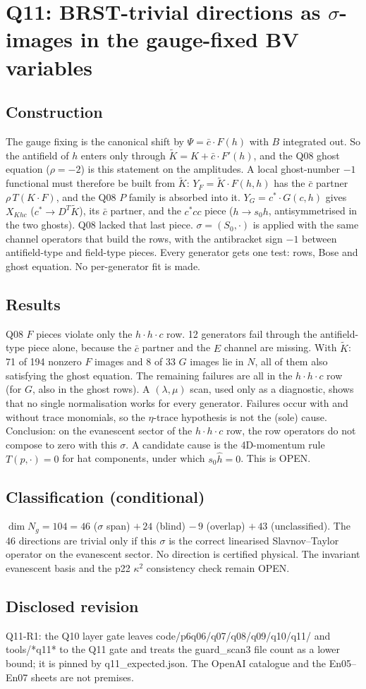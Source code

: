 \section{Q11: BRST-trivial directions as $\sigma$-images in the gauge-fixed BV variables}
\subsection*{Construction}
The gauge fixing is the canonical shift by $\Psi=\bar c\cdot F(h)$ with $B$ integrated out. So the antifield of $h$
enters only through $\tilde K=K+\bar c\cdot F'(h)$, and the Q08 ghost equation ($\rho=-2$) is this statement on the
amplitudes. A local ghost-number $-1$ functional must therefore be built from $\tilde K$: $Y_F=\tilde K\cdot F(h,h)$ has
the $\bar c$ partner $\rho\,T(K\cdot F)$, and the Q08 $P$ family is absorbed into it. $Y_G=c^*\cdot G(c,h)$ gives
$X_{Khc}$ ($c^*\to D^T\tilde K$), its $\bar c$ partner, and the $c^*cc$ piece ($h\to s_0h$, antisymmetrised in the
two ghosts). Q08 lacked that last piece. $\sigma=(S_0,\cdot)$ is applied with the same channel operators that build
the rows, with the antibracket sign $-1$ between antifield-type and field-type pieces. Every generator gets one test:
rows, Bose and ghost equation. No per-generator fit is made.
\subsection*{Results}
Q08 $F$ pieces violate only the $h\!\cdot\!h\!\cdot\!c$ row. 12 generators fail through the antifield-type piece alone,
because the $\bar c$ partner and the $E$ channel are missing. With $\tilde K$: 71 of 194 nonzero $F$ images and 8 of 33
$G$ images lie in $N$, all of them also satisfying the ghost equation. The remaining failures are all in the
$h\!\cdot\!h\!\cdot\!c$ row (for $G$, also in the ghost rows). A $(\lambda,\mu)$ scan, used only as a diagnostic, shows
that no single normalisation works for every generator. Failures occur with and without trace monomials, so the
$\eta$-trace hypothesis is not the (sole) cause. Conclusion: on the evanescent sector of the $h\!\cdot\!h\!\cdot\!c$ row,
the row operators do not compose to zero with this $\sigma$. A candidate cause is the 4D-momentum rule
$T(p,\cdot)=0$ for hat components, under which $s_0\hat h=0$. This is OPEN.
\subsection*{Classification (conditional)}
$\dim N_g=104=46$ ($\sigma$ span) $+\,24$ (blind) $-\,9$ (overlap) $+\,43$ (unclassified). The 46 directions are
trivial only if this $\sigma$ is the correct linearised Slavnov--Taylor operator on the evanescent sector. No
direction is certified physical. The invariant evanescent basis and the p22 $\kappa^2$ consistency check remain OPEN.
\subsection*{Disclosed revision}
Q11-R1: the Q10 layer gate leaves code/p6q06/q07/q08/q09/q10/q11/ and tools/*q11* to the Q11 gate and treats the
guard\_scan3 file count as a lower bound; it is pinned by
q11\_expected.json. The OpenAI catalogue and the En05--En07 sheets are not premises.
